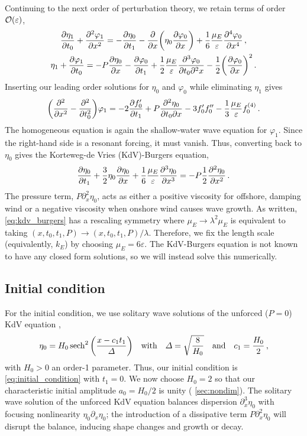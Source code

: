 \documentclass{jfm}
\renewcommand*{\epsilon}{\varepsilon}
\begin{document}
Continuing to the next order of perturbation theory, we retain terms of
order $\order{\epsilon}$,
\begin{gather}
    \pdv{\eta_1}{t_0} + \pdv[2]{\varphi_{1}}{x} =
      -\pdv{\eta_0}{t_1} - \pdv{x} \pqty{\eta_0 \pdv{\varphi_0}{x}} +
      \frac{1}{6} \frac{\mu_E}{\epsilon} \pdv[4]{\varphi_0}{x} \,,
  \\
    \eta_1 + \pdv{\varphi_1}{t_0} = -P \pdv{\eta_0}{x} -\pdv{\varphi_0}{t_1}
      + \frac{1}{2} \frac{\mu_E}{\epsilon} \frac{\partial^3 \varphi_0}
        {\partial t_0 \partial^2 x}
      - \frac{1}{2} \pqty{ \pdv{\varphi_0}{x} }^2
  \,.
\end{gather}
Inserting our leading order solutions for $\eta_0$ and $\varphi_0$ while
eliminating $\eta_1$ gives
\begin{equation}
  \pqty{\pdv[2]{x} - \pdv[2]{t_0}} \varphi_1 = -2 \pdv{f_0'}{t_1} +
    P\pdv{\eta_0}{t_0}{x} - 3 f_0' f_0'' - \frac{1}{3} \frac{\mu_E}{\epsilon}
    f_0^{(4)} \,.
\end{equation}
The homogeneous equation is again the shallow-water wave equation for
$\varphi_1$.
Since the right-hand side is a resonant forcing, it must vanish.
Thus, converting back to $\eta_0$ gives the Korteweg-de Vries
(KdV)-Burgers equation,
\begin{equation}
  \pdv{\eta_0}{t_1} + \frac{3}{2}
    \eta_0 \pdv{\eta_0}{x} + \frac{1}{6} \frac{\mu_E}{\epsilon}
    \pdv[3]{\eta_0}{x} = -P \frac{1}{2} \pdv[2]{\eta_0}{x} \,.
  \label{eq:kdv_burgers}
\end{equation}
The pressure term, $P \partial^2_x \eta_0$, acts as either a positive
viscosity for offshore, damping wind or a negative viscosity when
onshore wind causes wave growth.
As written, \cref{eq:kdv_burgers} has a rescaling symmetry where $\mu_E
\to \lambda^2 \mu_E$ is equivalent to taking $(x,t_0,t_1,P) \to
(x,t_0,t_1,P)/\lambda$.
Therefore, we fix the length scale (equivalently, $k_E$) by choosing
$\mu_E = 6 \epsilon$.
The KdV-Burgers equation is not known to have any closed form solutions,
so we will instead solve this numerically.

\subsection{\label{sec:initial} Initial condition}
For the initial condition, we use solitary wave solutions of the unforced
($P=0$) KdV equation \citep[\eg][]{mei2005nonlinear},
\begin{equation}
  \eta_0 = H_0 \sech^2\pqty{\frac{x - c_1 t_1}{\Delta}}
  \qq{with}
  \Delta = \sqrt{\frac{8}{H_0}}
  \qq{and}
  c_1 = \frac{H_0}{2} \,,
  \label{eq:initial_condition}
\end{equation}
with $H_0>0$ an order-1 parameter.
Thus, our initial condition is \cref{eq:initial_condition} with $t_1=0$.
We now choose $H_0 = 2$ so that our characteristic initial amplitude
$a_0 = H_0/2$ is unity (\cf{} \cref{sec:nondim}).
The solitary wave solution of the unforced KdV equation balances
dispersion $\partial_x^3 \eta_0$ with focusing nonlinearity $\eta_0
\partial_x \eta_0$; the introduction of a dissipative term $P
\partial_x^2 \eta_0$ will disrupt the balance, inducing shape changes
and growth or decay.
\end{document}
